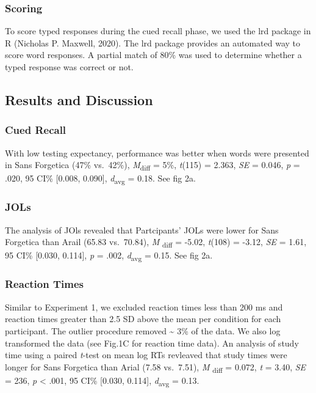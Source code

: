 \documentclass[
  english,
  jou]{apa6}
\begin{document}
\hypertarget{scoring}{%
\subsubsection{Scoring}\label{scoring}}

To score typed responses during the cued recall phase, we used the lrd package in R (Nicholas P. Maxwell, 2020). The lrd package provides an automated way to score word responses. A partial match of 80\% was used to determine whether a typed response was correct or not.

\hypertarget{results-and-discussion-1}{%
\subsection{Results and Discussion}\label{results-and-discussion-1}}

\hypertarget{cued-recall}{%
\subsubsection{Cued Recall}\label{cued-recall}}

With low testing expectancy, performance was better when words were presented in Sans Forgetica (47\% vs.~42\%), \emph{M}\textsubscript{diff} = 5\%, \emph{t}(115) = 2.363, \emph{SE} = 0.046, \emph{p} = .020, 95 CI\% {[}0.008, 0.090{]}, \emph{d}\textsubscript{avg} = 0.18. See fig 2a.

\hypertarget{jols-1}{%
\subsubsection{JOLs}\label{jols-1}}

The analysis of JOls revealed that Partcipants' JOLs were lower for Sans Forgetica than Arail (65.83 vs.~70.84), \emph{M} \textsubscript{diff} = -5.02, \emph{t}(108) = -3.12, \emph{SE} = 1.61, 95 CI\% {[}0.030, 0.114{]}, \emph{p} = .002, \emph{d}\textsubscript{avg} = 0.15. See fig 2a.

\hypertarget{reaction-times}{%
\subsubsection{Reaction Times}\label{reaction-times}}

Similar to Experiment 1, we excluded reaction times less than 200 ms and reaction times greater than 2.5 SD above the mean per condition for each participant. The outlier procedure removed \textasciitilde{} 3\% of the data. We also log transformed the data (see Fig.1C for reaction time data). An analysis of study time using a paired \emph{t}-test on mean log RTs revleaved that study times were longer for Sans Forgetica than Arial (7.58 vs.~7.51), \emph{M} \textsubscript{diff} = 0.072, \emph{t} = 3.40, \emph{SE} = 236, \emph{p} \textless{} .001, 95 CI\% {[}0.030, 0.114{]}, \emph{d}\textsubscript{avg} = 0.13.
\end{document}
